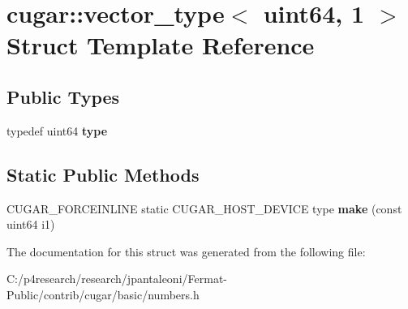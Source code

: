 \hypertarget{structcugar_1_1vector__type_3_01uint64_00_011_01_4}{}\section{cugar\+:\+:vector\+\_\+type$<$ uint64, 1 $>$ Struct Template Reference}
\label{structcugar_1_1vector__type_3_01uint64_00_011_01_4}
\subsection*{Public Types}
\begin{DoxyCompactItemize}
\item 
\mbox{\label{structcugar_1_1vector__type_3_01uint64_00_011_01_4_a6ddee569d21c7423fe995bd3da2ebded}} 
typedef uint64 {\bfseries type}
\end{DoxyCompactItemize}
\subsection*{Static Public Methods}
\begin{DoxyCompactItemize}
\item 
\mbox{\label{structcugar_1_1vector__type_3_01uint64_00_011_01_4_abee841da7ad2a69328d2d8eb54f77750}} 
C\+U\+G\+A\+R\+\_\+\+F\+O\+R\+C\+E\+I\+N\+L\+I\+NE static C\+U\+G\+A\+R\+\_\+\+H\+O\+S\+T\+\_\+\+D\+E\+V\+I\+CE type {\bfseries make} (const uint64 i1)
\end{DoxyCompactItemize}


The documentation for this struct was generated from the following file\+:\begin{DoxyCompactItemize}
\item 
C\+:/p4research/research/jpantaleoni/\+Fermat-\/\+Public/contrib/cugar/basic/numbers.\+h\end{DoxyCompactItemize}
